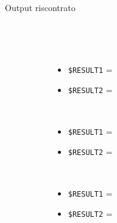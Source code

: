 \documentclass[../../SperimentazioniPratiche.tex]{subfiles}
\begin{document}
\begin{tcolorbox}[fonttitle=\bfseries, 
								adjusted title={\Large Prova 1C.1}, 
								breakable, 
								sharp corners=south,
								colback=white, 
								colframe=white!60!black]
\begin{description}
        			\item[Output riscontrato] \ \par
        				\begin{description}
        				
        					\item[\dispositivoA] \ \par
        					\begin{itemize}
        						\item \verb|$RESULT1| = \ok
        						\item \verb|$RESULT2| = \ok
        					\end{itemize}      					
        					
        					\item[\dispositivoB] \ \par
        					\begin{itemize}
        						\item \verb|$RESULT1| = \ok
        						\item \verb|$RESULT2| = \ok
        					\end{itemize}
        					
        					\item[\dispositivoC] \ \par
        					\begin{itemize}
        						\item \verb|$RESULT1| = \ok
        						\item \verb|$RESULT2| = \ok
        					\end{itemize}
        					
        				\end{description}
        				
				\end{description}  
				
			\end{tcolorbox}
			
	\newpage
	\paragraph*{}
	\label{2Prova1C.2}
			
\end{document}
